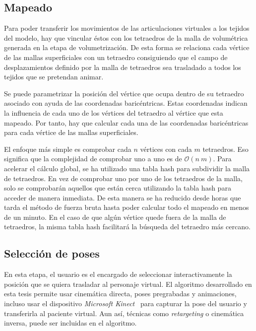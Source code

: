 \subsection{Mapeado}
\label{posing:Mapeado}
%
Para poder transferir los movimientos de las articulaciones virtuales a los tejidos del modelo, hay que vincular éstos con los tetraedros de la malla de volumétrica generada en la etapa de volumetrización. De esta forma se relaciona cada vértice de las mallas superficiales con un tetraedro consiguiendo que el campo de desplazamientos definido por la malla de tetraedros sea trasladado a todos los tejidos que se pretendan animar.

Se puede parametrizar la posición del vértice que ocupa dentro de su tetraedro asociado con ayuda de las coordenadas baricéntricas. Estas coordenadas indican la influencia de cada uno de los vértices del tetraedro al vértice que esta mapeado. Por tanto, hay que calcular cada una de las coordenadas baricéntricas para cada vértice de las mallas superficiales.

El enfoque más simple es comprobar cada $n$ vértices con cada $m$ tetraedros. Eso significa que la complejidad de comprobar uno a uno es de $\mathcal{O}(n\ m)$. Para acelerar el cálculo global, se ha utilizado una \ac{tabla hash} \cite{Teschner2003} para subdividir la malla de tetraedros. En vez de comprobar uno por uno de los tetraedros de la malla, solo se comprobarán aquellos que están cerca utilizando la \ac{tabla hash} para acceder de manera inmediata. De esta manera se ha reducido desde horas que tarda el método de fuerza bruta hasta poder calcular todo el mapeado en menos de un minuto. En el caso de que algún vértice quede fuera de la malla de tetraedros, la misma \ac{tabla hash} facilitará la búsqueda del tetraedro más cercano.


\subsection{Selección de poses}
\label{posing:Poses}
%
En esta etapa, el usuario es el encargado de seleccionar interactivamente la posición que se quiera trasladar al personaje virtual. El algoritmo desarrollado en esta tesis permite usar cinemática directa, poses pregrabadas y animaciones, incluso usar el dispositivo \emph{Microsoft Kinect}~\cite{shotton2013} para capturar la pose del usuario y transferirla al paciente virtual. Aun así, técnicas como \emph{retargeting} \cite{7581666} o cinemática inversa, puede ser incluidas en el algoritmo.

